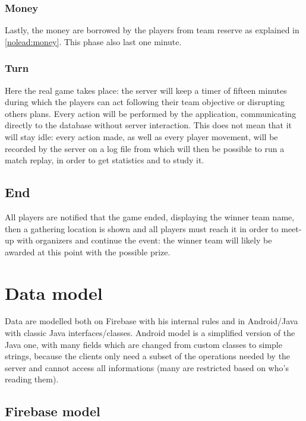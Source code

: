 			\subsubsection{Money}
				
				Lastly, the money are borrowed by the players from team reserve as explained in \autoref{nolead:money}.
				This phase also last one minute.
							
			\subsubsection{Turn}
			
				Here the real game takes place: the server will keep a timer of fifteen minutes during which the players can act following their team objective or disrupting others plans.
				Every action will be performed by the application, communicating directly to the database without server interaction. This does not mean that it will stay idle: every action made, as well as every player movement, will be recorded by the server on a log file from which will then be possible to run a match replay, in order to get statistics and to study it.
			
		\subsection{End}
		
			All players are notified that the game ended, displaying the winner team name, then a gathering location is shown and all players must reach it in order to meet-up with organizers and continue the event: the winner team will likely be awarded at this point with the possible prize.
			
	\section{Data model}	
		
		Data are modelled both on Firebase with his internal rules and in Android/Java with classic Java interfaces/classes.
		Android model is a simplified version of the Java one, with many fields which are changed from custom classes to simple strings, because the clients only need a subset of the operations needed by the server and cannot access all informations (many are restricted based on who's reading them).
		
		\subsection{Firebase model}
			
